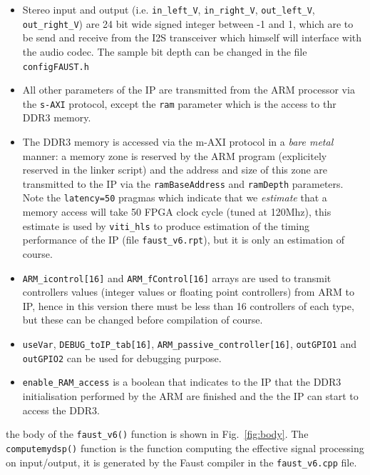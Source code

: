 \documentclass[11pt]{article}
\numberwithin{equation}{section}
\numberwithin{figure}{section}
\begin{document}
\begin{itemize}
\item Stereo input and output  (i.e. \verb#in_left_V#, \verb#in_right_V#, \verb#out_left_V#, \verb#out_right_V#) are 24 bit wide signed integer between -1 and 1, which are to be send and receive from the I2S transceiver which himself will interface with the audio codec. The sample bit depth can be changed in the file {\tt configFAUST.h}
  \item All other parameters of the IP are transmitted from the ARM processor via the {\tt s-AXI} protocol, except the {\tt ram} parameter which is the access to thr DDR3 memory. 
\item The DDR3 memory is accessed via the m-AXI protocol in a {\em bare metal} manner: a memory zone is reserved by the ARM program (explicitely reserved in the linker script) and the address and size of this zone are transmitted to the IP via the {\tt ramBaseAddress} and {\tt ramDepth} parameters. Note the {\tt latency=50} pragmas which indicate that we {\em estimate} that a memory access will take 50 FPGA clock cycle (tuned at 120Mhz), this estimate is used by {\tt viti\_hls} to produce estimation of the timing performance of the IP (file {\tt faust\_v6.rpt}), but it is only an estimation of course.
\item {\tt ARM\_icontrol[16]} and {\tt ARM\_fControl[16]} arrays are used to transmit controllers values (integer values or floating point controllers) from ARM to IP, hence in this version there must be less than 16 controllers of each type, but these can be changed before compilation of course.
\item {\tt useVar}, {\tt DEBUG\_toIP\_tab[16]}, {\tt ARM\_passive\_controller[16]}, {\tt outGPIO1} and {\tt outGPIO2} can be used for debugging purpose.
\item {\tt enable\_RAM\_access} is a boolean that indicates to the IP that the DDR3 initialisation performed by the ARM are finished and the the IP can start to access the DDR3.
\end{itemize}

the body of the {\tt faust\_v6()} function is shown in Fig.~\ref{fig:body}. The {\tt computemydsp()} function is the function computing the effective signal processing on input/output, it is generated by the Faust compiler in the {\tt faust\_v6.cpp} file.
\end{document}
